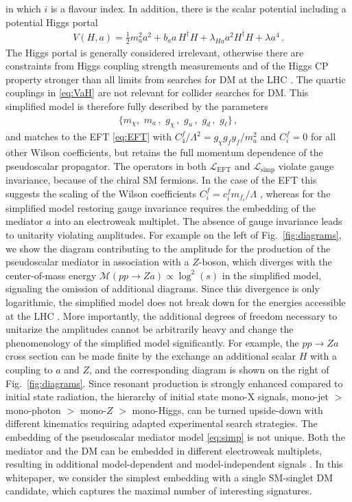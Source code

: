 \documentclass[12pt]{article}
\renewcommand\({\left(}
\renewcommand\){\right)}
\renewcommand\[{\left[}
\renewcommand\]{\right]}
\begin{document}
in which $i$ is a flavour index. In addition, there is the scalar potential including a potential Higgs portal 
\begin{align}\label{eq:VaH}
V(H, a)=\frac{1}{2}m_a^2 a^2+b_{a} a\,H^\dagger H +\lambda_{Ha} a^2H^\dagger H + \lambda a^4\,.
\end{align}
The Higgs portal is generally considered irrelevant, otherwise there are constraints from Higgs coupling strength measurements and of the Higgs CP property stronger than all limits from searches for DM at the LHC \cite{}. The quartic couplings in \eqref{eq:VaH} are not relevant for collider searches for DM.
This simplified model is therefore fully described by the parameters 
\begin{align}
\big\{ m_\chi, \,\, m_a\,,\,\, g_\chi\,, \,\, g_u\,,\,\,g_d\,,\,\, g_\ell \big\}\,,
\end{align}
and
matches to the EFT \eqref{eq:EFT} with $C^f_4/\Lambda^2 = g_\chi g_f y_f  /m_a^2$ and $C_i^f=0$ for all other Wilson coefficients, but retains the full momentum dependence of the pseudoscalar propagator.  The operators in both $\mathcal{L}_\text{EFT}$ and $\mathcal{L}_\text{simp}$ violate gauge invariance, because of the chiral SM fermions. In the case of the EFT this suggests the scaling of the Wilson coefficients $C_i^f= c_i^f m_{f_i}/\Lambda$ \cite{}, whereas for the simplified model restoring gauge invariance requires the embedding of the mediator $a$ into an electroweak multiplet. The absence of gauge invariance leads to unitarity violating amplitudes. For example on the left of Fig.~\ref{fig:diagrams}, we show the diagram contributing to the amplitude for the production of the pseudoscalar mediator in association with a $Z$-boson, which diverges with the center-of-mass energy $\mathcal{M}(pp\to Z a) \propto \log^2(s)$ in the simplified model, signaling the omission of additional diagrams. Since this divergence is only logarithmic, the simplified model does not break down for the energies accessible at the LHC \cite{}. More importantly, the additional degrees of freedom necessary to unitarize the amplitudes cannot be arbitrarily heavy and change the phenomenology of the simplified model significantly. For example, the $pp\to Z a$ cross section can be made finite by the exchange an additional scalar $H$ with a coupling to $a$ and $Z$, and the corresponding diagram is shown on the right of Fig.~\ref{fig:diagrams}. Since resonant production is strongly enhanced compared to initial state radiation, the hierarchy of initial state mono-X signals, mono-jet $>$ mono-photon $>$ mono-$Z$ $>$ mono-Higgs, can be turned upside-down with different kinematics requiring adapted experimental search strategies. The embedding of the pseudoscalar mediator model \eqref{eq:simp} is not unique. Both the mediator and the DM can be embedded in different electroweak multiplets, resulting in additional model-dependent and model-independent signals \cite{}. In this whitepaper, we consider the simplest embedding with a single SM-singlet DM candidate, which captures the maximal number of interesting signatures.     
\end{document}

